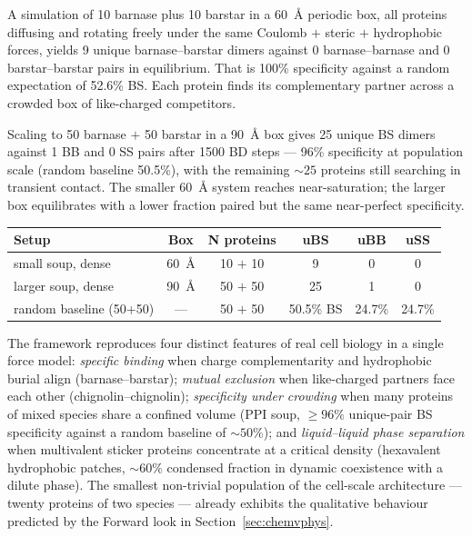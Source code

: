 \documentclass[11pt]{article}
\begin{document}
A simulation of 10 barnase plus 10 barstar in a 60~\AA{} periodic box, all proteins diffusing and rotating freely under the same Coulomb $+$ steric $+$ hydrophobic forces, yields 9 unique barnase--barstar dimers against 0 barnase--barnase and 0 barstar--barstar pairs in equilibrium. That is 100\% specificity against a random expectation of 52.6\% BS. Each protein finds its complementary partner across a crowded box of like-charged competitors.

Scaling to 50 barnase $+$ 50 barstar in a 90~\AA{} box gives 25 unique BS dimers against 1 BB and 0 SS pairs after 1500 BD steps --- 96\% specificity at population scale (random baseline 50.5\%), with the remaining $\sim 25$ proteins still searching in transient contact. The smaller 60~\AA{} system reaches near-saturation; the larger box equilibrates with a lower fraction paired but the same near-perfect specificity.

\begin{center}
\begin{tabular}{lccccc}
\hline
\textbf{Setup} & \textbf{Box} & \textbf{N proteins} & \textbf{uBS} & \textbf{uBB} & \textbf{uSS} \\
\hline
small soup, dense         & 60~\AA{}  & 10 $+$ 10 & 9  & 0 & 0 \\
larger soup, dense        & 90~\AA{}  & 50 $+$ 50 & 25 & 1 & 0 \\
random baseline (50+50)   & ---       & 50 $+$ 50 & 50.5\% BS & 24.7\% & 24.7\% \\
\hline
\end{tabular}
\end{center}

The framework reproduces four distinct features of real cell biology in a single force model: \emph{specific binding} when charge complementarity and hydrophobic burial align (barnase--barstar); \emph{mutual exclusion} when like-charged partners face each other (chignolin--chignolin); \emph{specificity under crowding} when many proteins of mixed species share a confined volume (PPI soup, $\ge 96\%$ unique-pair BS specificity against a random baseline of $\sim 50\%$); and \emph{liquid--liquid phase separation} when multivalent sticker proteins concentrate at a critical density (hexavalent hydrophobic patches, $\sim 60\%$ condensed fraction in dynamic coexistence with a dilute phase). The smallest non-trivial population of the cell-scale architecture --- twenty proteins of two species --- already exhibits the qualitative behaviour predicted by the Forward look in Section~\ref{sec:chemvphys}.
\end{document}
